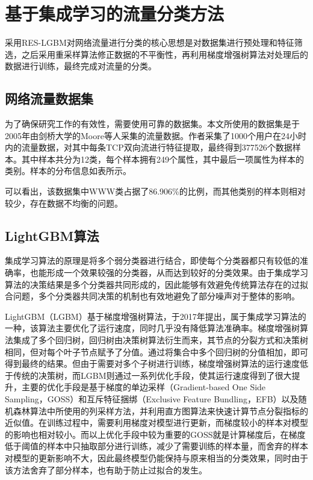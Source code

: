 \documentclass[a4papper]{article}
\begin{document}
\section{基于集成学习的流量分类方法}
\par\setlength{\parindent}{2em} %
采用RES-LGBM对网络流量进行分类的核心思想是对数据集进行预处理和特征筛选，之后采用重采样算法修正数据的不平衡性，再利用梯度增强树算法对处理后的数据进行训练，最终完成对流量的分类。
\subsection{网络流量数据集}
\par\setlength{\parindent}{2em} %
为了确保研究工作的有效性，需要使用可靠的数据集。本文所使用的数据集是于2005年由剑桥大学的Moore等人采集的流量数据。作者采集了1000个用户在24小时内的流量数据，对其中每条TCP双向流进行特征提取，最终得到377526个数据样本。其中样本共分为12类，每个样本拥有249个属性，其中最后一项属性为样本的类别。样本的分布信息如表所示。
\par\setlength{\parindent}{2em} %
可以看出，该数据集中WWW类占据了86.906\%的比例，而其他类别的样本则相对较少，存在数据不均衡的问题。
\subsection{LightGBM算法}
\par\setlength{\parindent}{2em} %
集成学习算法的原理是将多个弱分类器进行结合，即使每个分类器都只有较低的准确率，也能形成一个效果较强的分类器，从而达到较好的分类效果。由于集成学习算法的决策结果是多个分类器共同形成的，因此能够有效避免传统算法存在的过拟合问题，多个分类器共同决策的机制也有效地避免了部分噪声对于整体的影响。
\par\setlength{\parindent}{2em} %
LightGBM（LGBM）基于梯度增强树算法，于2017年提出，属于集成学习算法的一种，该算法主要优化了运行速度，同时几乎没有降低算法准确率。梯度增强树算法集成了多个回归树，回归树由决策树算法衍生而来，其节点的分裂方式和决策树相同，但对每个叶子节点赋予了分值。通过将集合中多个回归树的分值相加，即可得到最终的结果。但由于需要对多个子树进行训练，梯度增强树算法的运行速度低于传统的决策树，而LGBM则通过一系列优化手段，使其运行速度得到了很大提升，主要的优化手段是基于梯度的单边采样（Gradient-based One Side Sampling，GOSS）和互斥特征捆绑（Exclusive Feature Bundling，EFB）以及随机森林算法中所使用的列采样方法，并利用直方图算法来快速计算节点分裂指标的近似值。在训练过程中，需要利用梯度对模型进行更新，而梯度较小的样本对模型的影响也相对较小。而以上优化手段中较为重要的GOSS就是计算梯度后，在梯度低于阈值的样本中只抽取部分进行训练，减少了需要训练的样本量，而舍弃的样本对模型的更新影响不大，因此最终模型仍能保持与原来相当的分类效果，同时由于该方法舍弃了部分样本，也有助于防止过拟合的发生。
\end{document}
